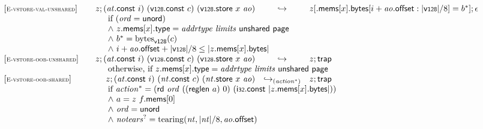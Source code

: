 $$\begin{array}[t]{@{}lrcl@{}l@{}}
{[\textsc{\scriptsize E{-}vstore{-}val{-}unshared}]} \quad & z ; ({\mathit{at}}{.}\mathsf{const}~i)~(\mathsf{v{\scriptstyle 128}}{.}\mathsf{const}~c)~(\mathsf{v{\scriptstyle 128}}{.}\mathsf{store}~x~{\mathit{ao}}) & \hookrightarrow & z{}[{.}\mathsf{mems}{}[x]{.}\mathsf{bytes}{}[i + {\mathit{ao}}{.}\mathsf{offset} : {|\mathsf{v{\scriptstyle 128}}|} / 8] = {b^\ast}] ; \epsilon &  \\
& \multicolumn{4}{@{}l@{}}{\quad
\quad
\begin{array}[t]{@{}l@{}}
\mbox{if}~ ({\mathit{ord}} = \mathsf{unord}) \\
{\land}~ z{.}\mathsf{mems}{}[x]{.}\mathsf{type} = {\mathit{addrtype}}~{\mathit{limits}}~\mathsf{unshared}~\mathsf{page} \\
{\land}~ {b^\ast} = {{\mathrm{bytes}}}_{\mathsf{v{\scriptstyle 128}}}(c) \\
{\land}~ i + {\mathit{ao}}{.}\mathsf{offset} + {|\mathsf{v{\scriptstyle 128}}|} / 8 \leq {|z{.}\mathsf{mems}{}[x]{.}\mathsf{bytes}|} \\
\end{array}
} \\
{[\textsc{\scriptsize E{-}vstore{-}oob{-}unshared}]} \quad & z ; ({\mathit{at}}{.}\mathsf{const}~i)~(\mathsf{v{\scriptstyle 128}}{.}\mathsf{const}~c)~(\mathsf{v{\scriptstyle 128}}{.}\mathsf{store}~x~{\mathit{ao}}) & \hookrightarrow & z ; \mathsf{trap} &  \\
& \multicolumn{4}{@{}l@{}}{\quad
\quad \mbox{otherwise, if}~ z{.}\mathsf{mems}{}[x]{.}\mathsf{type} = {\mathit{addrtype}}~{\mathit{limits}}~\mathsf{unshared}~\mathsf{page}
} \\
{[\textsc{\scriptsize E{-}vstore{-}oob{-}shared}]} \quad & z ; ({\mathit{at}}{.}\mathsf{const}~i)~({\mathit{nt}}{.}\mathsf{const}~c)~({\mathit{nt}}{.}\mathsf{store}~x~{\mathit{ao}}) & {\hookrightarrow}_{({{\mathit{action}}^\ast})} {} & z ; \mathsf{trap} &  \\
& \multicolumn{4}{@{}l@{}}{\quad
\quad
\begin{array}[t]{@{}l@{}}
\mbox{if}~ {{\mathit{action}}^\ast} = (\mathsf{rd}~{\mathit{ord}}~((\mathsf{reglen}~a)~0)~(\mathsf{i{\scriptstyle 32}}{.}\mathsf{const}~{|z{.}\mathsf{mems}{}[x]{.}\mathsf{bytes}|})) \\
{\land}~ a = z~f{.}\mathsf{mems}{}[0] \\
{\land}~ {\mathit{ord}} = \mathsf{unord} \\
{\land}~ {{\mathit{notears}}^?} = {\mathrm{tearing}}({\mathit{nt}}, {|{\mathit{nt}}|} / 8, {\mathit{ao}}{.}\mathsf{offset}) \\

\end{array}}
\end{array}$$
